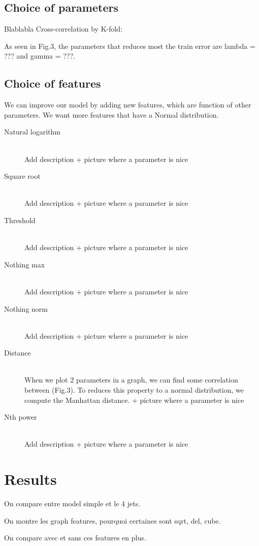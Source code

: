 \documentclass[10pt,conference,compsocconf]{IEEEtran}
\begin{document}
\subsection{Choice of parameters}
Blablabla
Cross-correlation by K-fold:

As seen in Fig.3, the parameters that reduces most the train error are lambda = ??? and gamma = ???.

\subsection{Choice of features}

We can improve our model by adding new features, which are function of other parameters. We want more features that have a Normal distribution. 
\begin{description}
	\item[Natural logarithm] \ \\
	Add description + picture where a parameter is nice
	\item[Square root] \ \\
	Add description + picture where a parameter is nice
	\item[Threshold] \ \\
	Add description + picture where a parameter is nice
	\item[Nothing max] \ \\
	Add description + picture where a parameter is nice
	\item[Nothing norm] \ \\
	Add description + picture where a parameter is nice
	\item[Distance] \ \\
	When we plot 2 parameters in a graph, we can find some correlation between (Fig.3). To reduces this property to a normal distribution, we compute the Manhattan distance. + picture where a parameter is nice
	\item[Nth power] \ \\
	Add description + picture where a parameter is nice
\end{description}
\section{Results}
On compare entre model simple et le 4 jets.

On montre les graph features, pourquoi certaines sont sqrt, del, cube.

On compare avec et sans ces features en plus.
\end{document}

